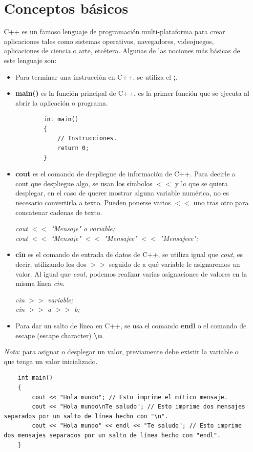 \section{Conceptos básicos}
\hspace{0.55cm}C++ es un famoso lenguaje de programación multi-plataforma para crear aplicaciones tales como sistemas operativos, navegadores, videojuegos, aplicaciones de ciencia o arte, etcétera. Algunas de las nociones más básicas de este lenguaje son:
\begin{itemize}
    \item Para terminar una instrucción en C++, se utiliza el \textbf{;}.
    \item \textbf{main()} es la función principal de C++, es la primer función que se ejecuta al abrir la aplicación o programa.
    \begin{lstlisting}
        int main()
        {
            // Instrucciones.
            return 0;
        }
    \end{lstlisting}
    \item \textbf{cout} es el comando de despliegue de información de C++. Para decirle a cout que despliegue algo, se usan los símbolos \textbf{$<<$} y lo que se quiera desplegar, en el caso de querer mostrar alguna variable numérica, no es necesario convertirla a texto. Pueden ponerse varios $<<$ uno tras otro para concatenar cadenas de texto.
    \begin{center}
        \textit{
			cout $<<$ "Mensaje" o variable; \\
			cout $<<$ "Mensaje" $<<$ "Mensajee" $<<$ "Mensajeee";
		}
    \end{center}
    \item \textbf{cin} es el comando de entrada de datos de C++, se utiliza igual que \textit{cout}, es decir, utilizando los dos \textbf{$>>$} seguido de a qué variable le asignaremos un valor. Al igual que \textit{cout}, podemos realizar varias asignaciones de valores en la misma línea \textit{cin}.
    \begin{center}
        \textit{
			cin $>>$ variable; \\
			cin $>>$ a $>>$ b;
		}
    \end{center}
    \item Para dar un salto de línea en C++, se usa el comando \textbf{endl} o el comando de escape (escape character) \textbf{\textbackslash n}.
\end{itemize}

\textit{Nota}: para asignar o desplegar un valor, previamente debe existir la variable o que tenga un valor inicializado.
\begin{lstlisting}
    int main()
    {
        cout << "Hola mundo"; // Esto imprime el mítico mensaje.
        cout << "Hola mundo\nTe saludo"; // Esto imprime dos mensajes separados por un salto de línea hecho con "\n".
        cout << "Hola mundo" << endl << "Te saludo"; // Esto imprime dos mensajes separados por un salto de línea hecho con "endl".
    }
\end{lstlisting}



